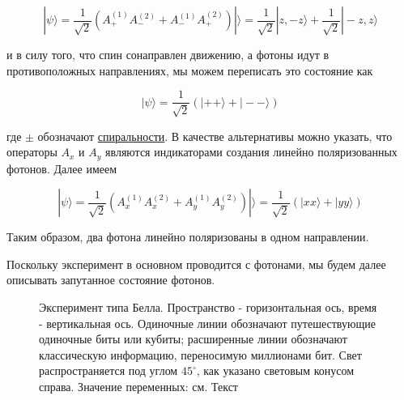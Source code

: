 \documentclass[main.tex]{subfiles}
\begin{document}
\begin{equation}\label{3.7}
	|\psi\rangle=\frac{1}{\sqrt{2}}\left(A_{+}^{(1)} A_{-}^{(2)}+A_{-}^{(1)} A_{+}^{(2)}\right)|\rangle=\frac{1}{\sqrt{2}}|z,-z\rangle+\frac{1}{\sqrt{2}}|-z, z\rangle
\end{equation}
            
и в силу того, что спин сонаправлен движению, а фотоны идут в противоположных направлениях, мы можем переписать это состояние как

\begin{equation}\label{3.8}
	|\psi\rangle=\frac{1}{\sqrt{2}}(|++\rangle+|--\rangle)
\end{equation}
       
где $\pm$ обозначают \href{https://en.wikipedia.org/wiki/Helicity_(particle_physics)}{спиральности}. В качестве альтернативы можно указать, что операторы $A_x$ и $A_y$ являются индикаторами создания линейно поляризованных фотонов. Далее имеем

\begin{equation}\label{3.9}
	|\psi\rangle=\frac{1}{\sqrt{2}}\left(A_{x}^{(1)} A_{x}^{(2)}+A_{y}^{(1)} A_{y}^{(2)}\right)|\rangle=\frac{1}{\sqrt{2}}(|x x\rangle+|y y\rangle)
\end{equation}
                                         
Таким образом, два фотона линейно поляризованы в одном направлении.

Поскольку эксперимент в основном проводится с фотонами, мы будем далее описывать запутанное состояние фотонов.

\begin{figure}[ht] %
	\begin{center}
		\caption{
		\label{i3.1} Эксперимент типа Белла. Пространство - горизонтальная ось, время - вертикальная ось. Одиночные линии обозначают путешествующие одиночные биты или кубиты; расширенные линии обозначают классическую информацию, переносимую миллионами бит. Свет распространяется под углом $45^\circ$, как указано световым конусом справа. Значение переменных: см. Текст}
	\end {center}
\end {figure}
\end{document}
